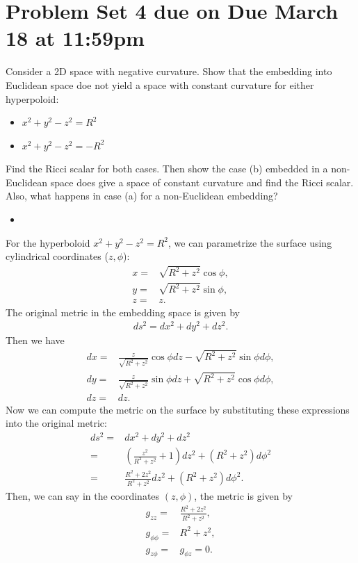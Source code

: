 \section*{Problem Set 4 due on Due March 18 at 11:59pm}
Consider a 2D space with negative curvature. Show that the embedding into Euclidean space doe not yield a space with constant curvature for either hyperpoloid:
\begin{itemize}
    \item [(a)] $x^2+y^2-z^2=R^2$
    \item [(b)] $x^2+y^2-z^2=-R^2$
\end{itemize}
Find the Ricci scalar for both cases. Then show the case (b) embedded in a non-Euclidean space does give a space of constant curvature and find the Ricci scalar. Also, what happens in case (a) for a non-Euclidean embedding?
\answer{}
\begin{itemize}
    \item [(a)]
\end{itemize}
For the hyperboloid $x^2+y^2-z^2=R^2$, we can parametrize the surface using cylindrical coordinates ($z, \phi$):
\begin{align}
    x=& \sqrt{R^2+z^2} \cos\phi,\\
    y=& \sqrt{R^2+z^2} \sin\phi,\\
    z=&z.
\end{align}
The original metric in the embedding space is given by
\begin{align}
    ds^2=dx^2+dy^2+dz^2.
\end{align}
Then we have 
\begin{align}
    dx=& \frac{z}{\sqrt{R^2+z^2}} \cos\phi dz - \sqrt{R^2+z^2} \sin\phi d\phi,\\
    dy=& \frac{z}{\sqrt{R^2+z^2}}\sin\phi dz + \sqrt{R^2+z^2} \cos\phi d\phi,\\
    dz=&dz.
\end{align}
Now we can compute the metric on the surface by substituting these expressions into the original metric:
\begin{align}
    ds^2=&dx^2+dy^2+dz^2\\
    =&\left(\frac{z^2}{R^2+z^2}+1\right)dz^2+(R^2+z^2)d\phi^2\\
    =&\frac{R^2+2z^2}{R^2+z^2}dz^2+(R^2+z^2)d\phi^2.
\end{align}
Then, we can say in the coordinates $(z, \phi)$, the metric is given by
\begin{align}
    g_{zz}=&\frac{R^2+2z^2}{R^2+z^2},\\
    g_{\phi\phi}=&R^2+z^2,\\
    g_{z\phi}=&g_{\phi z}=0.
\end{align}
